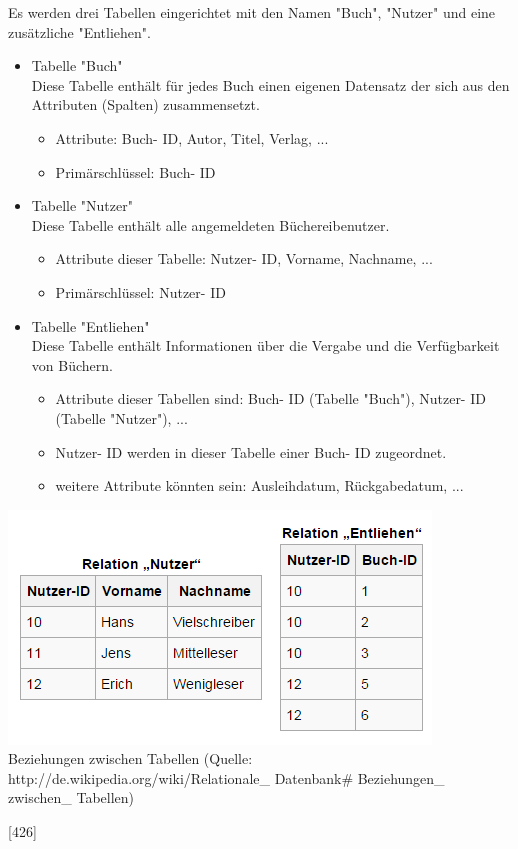 \documentclass[12pt,a4paper]{report}
\begin{document}
\begin{onehalfspace}
Es werden drei Tabellen eingerichtet mit den Namen "{}Buch"{}, "{}Nutzer"{} und eine zusätzliche "{}Entliehen"{}.
\begin{itemize}
\item Tabelle "{}Buch"{}\\
Diese Tabelle enthält für jedes Buch einen eigenen Datensatz der sich aus den Attributen (Spalten) zusammensetzt.
\begin{itemize}
\item Attribute: Buch- ID, Autor, Titel, Verlag, ...
\item Primärschlüssel: Buch- ID
\end{itemize}
\item Tabelle "{}Nutzer"{}\\
Diese Tabelle enthält alle angemeldeten Büchereibenutzer.
\begin{itemize}
\item Attribute dieser Tabelle: Nutzer- ID, Vorname, Nachname, ...
\item Primärschlüssel: Nutzer- ID
\end{itemize}
\item Tabelle "{}Entliehen"{}\\
Diese Tabelle enthält Informationen über die Vergabe und die Verfügbarkeit von Büchern.
\begin{itemize}
\item Attribute dieser Tabellen sind: Buch- ID (Tabelle "{}Buch"{}), Nutzer- ID (Tabelle "{}Nutzer"{}), ...
\item Nutzer- ID werden in dieser Tabelle einer Buch- ID zugeordnet.
\item weitere Attribute könnten sein: Ausleihdatum, Rückgabedatum, ...
\end{itemize}
\end{itemize}

\begin{center}
\includegraphics[scale=0.8]{img/tabellen.png}\\
Beziehungen zwischen Tabellen (Quelle: http://de.wikipedia.org/wiki/Relationale\_ Datenbank\# Beziehungen\_ zwischen\_ Tabellen)
\end{center}
[426]

\end{onehalfspace}
\end{document}
